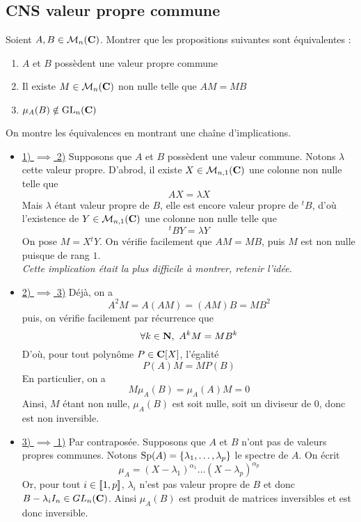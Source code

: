 \subsection{CNS valeur propre commune}

\begin{exercice}
	Soient $A,B\in\mathcal M_n(\operatorname{\mathbf{C}})$. Montrer que les propositions suivantes sont équivalentes :
	\begin{enumerate}
		\item $A$ et $B$ possèdent une valeur propre commune
		\item Il existe $M\in\mathcal M_n(\operatorname{\mathbf{C}})$ non nulle telle que $AM=MB$
		\item $\mu_A(B)\notin \operatorname{\mathrm{GL}}_n(\operatorname{\mathbf{C}})$
	\end{enumerate}
\end{exercice}

\begin{correction}
	On montre les équivalences en montrant une chaîne d'implications.
	\begin{itemize}
		\item[] \underline{1) $\implies$ 2)} Supposons que $A$ et $B$ possèdent une valeur commune. Notons $\lambda$ cette valeur propre. D'abrod, il existe $X\in\mathcal M_{n,1}(\operatorname{\mathbf{C}})$ une colonne non nulle telle que \[AX=\lambda X\]
		Mais $\lambda$ étant valeur propre de $B$, elle est encore valeur propre de ${}^tB$, d'où l'existence de $Y\in\mathcal M_{n,1}(\operatorname{\mathbf{C}})$ une colonne non nulle telle que \[{}^tBY=\lambda Y\]
		On pose $M=X{}^tY$. On vérifie facilement que $AM=MB$, puis $M$ est non nulle puisque de rang $1$.\\


		\textit{Cette implication était la plus difficile à montrer, retenir l'idée.}
		\item[]\underline{2) $\implies$ 3)} Déjà, on a \[A^2M=A(AM)=(AM)B=MB^2\]
		puis, on vérifie facilement par récurrence que \[\forall k\in\operatorname{\mathbf{N}},\ A^kM=MB^k\]
		D'où, pour tout polynôme $P\in\operatorname{\mathbf{C}}[X]$, l'égalité \[P(A)M=MP(B)\]
		En particulier, on a \[M\mu_A(B)=\mu_A(A)M=0\] 
		Ainsi, $M$ étant non nulle, $\mu_A(B)$ est soit nulle, soit un diviseur de $0$, donc est non inversible.
		\item[]\underline{3) $\implies$ 1)} Par contraposée. Supposons que $A$ et $B$ n'ont pas de valeurs propres communes. Notons $\operatorname{\mathrm{Sp}}(A)=\lbrace \lambda_1,\dots,\lambda_p\rbrace$ le spectre de $A$. On écrit \[\mu_A=(X-\lambda_1)^{\alpha_1}\dots(X-\lambda_p)^{\alpha_p}\]
		Or, pour tout $i\in[\![1,p]\!]$, $\lambda_i$ n'est pas valeur propre de $B$ et donc $B-\lambda_iI_n\in GL_n(\operatorname{\mathbf{C}})$. Ainsi $\mu_A(B)$ est produit de matrices inversibles et est donc inversible.
	\end{itemize}	
\end{correction}

